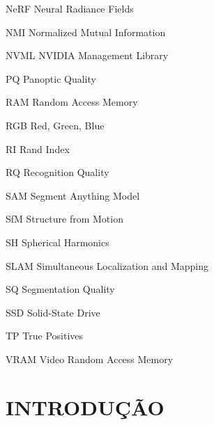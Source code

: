 \begin{siglas}
    \item[NeRF] Neural Radiance Fields
    \item[NMI] Normalized Mutual Information
    \item[NVML] NVIDIA Management Library
    \item[PQ] Panoptic Quality
    \item[RAM] Random Access Memory
    \item[RGB] Red, Green, Blue
    \item[RI] Rand Index
    \item[RQ] Recognition Quality
    \item[SAM] Segment Anything Model
    \item[SfM] Structure from Motion
    \item[SH] Spherical Harmonics
    \item[SLAM] Simultaneous Localization and Mapping
    \item[SQ] Segmentation Quality
    \item[SSD] Solid-State Drive
    \item[TP] True Positives
    \item[VRAM] Video Random Access Memory
\end{siglas}

\tableofcontents*
\cleardoublepage

\setcounter{page}{1}

\textual

\chapter{INTRODUÇÃO}

